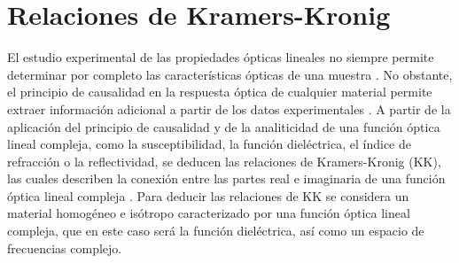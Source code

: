 

\section{Relaciones de Kramers-Kronig}
\label{section:yth}

El estudio experimental de las propiedades ópticas lineales no siempre permite determinar por completo las características ópticas de una muestra \cite{KramersKronigRelationsSum2005}. No obstante, el principio de causalidad en la respuesta óptica de cualquier material permite extraer información adicional a partir de los datos experimentales \cite{KramersKronigRelationsSum2005}.  A partir de la aplicación del principio de causalidad y de la analiticidad de una función óptica lineal compleja, como la susceptibilidad, la función dieléctrica, el índice de refracción o la reflectividad, se deducen las relaciones de Kramers-Kronig (KK), las cuales describen la conexión entre las partes real e imaginaria de una función óptica lineal compleja \cite{KramersKronigRelationsSum2005}. Para deducir las relaciones de KK se considera un material homogéneo e isótropo caracterizado por una función óptica lineal compleja, que en este caso será la función dieléctrica, así como un espacio de frecuencias complejo.

